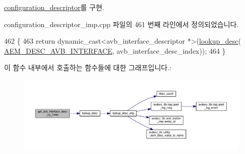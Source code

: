\hyperlink{classavdecc__lib_1_1configuration__descriptor_a177c390ccb74a31750b8eb0feb406144}{configuration\+\_\+descriptor}를 구현.



configuration\+\_\+descriptor\+\_\+imp.\+cpp 파일의 461 번째 라인에서 정의되었습니다.


\begin{DoxyCode}
462 \{
463     \textcolor{keywordflow}{return} \textcolor{keyword}{dynamic\_cast<}avb\_interface\_descriptor *\textcolor{keyword}{>}(\hyperlink{classavdecc__lib_1_1configuration__descriptor__imp_a265e068ed32f7c3694417ffe2c382309}{lookup\_desc}(
      \hyperlink{namespaceavdecc__lib_ac7b7d227e46bc72b63ee9e9aae15902fa5c354fe160628ac90da9257d8e0cb0ee}{AEM\_DESC\_AVB\_INTERFACE}, avb\_interface\_desc\_index));
464 \}
\end{DoxyCode}


이 함수 내부에서 호출하는 함수들에 대한 그래프입니다.\+:
\nopagebreak
\begin{figure}[H]
\begin{center}
\leavevmode
\includegraphics[width=350pt]{classavdecc__lib_1_1configuration__descriptor__imp_a034001c3d6ad271fffaace42ccf3262c_cgraph}
\end{center}
\end{figure}


